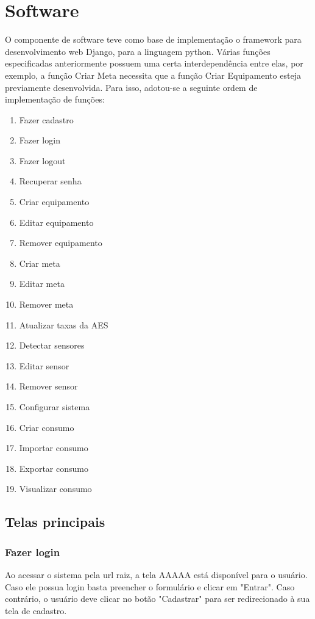\section{Software}
\label{Sec:5-software}

O componente de software teve como base de implementação o framework para desenvolvimento web Django, para a linguagem python. Várias funções especificadas anteriormente possuem uma certa interdependência entre elas, por exemplo, a função Criar Meta necessita que a função Criar Equipamento esteja previamente desenvolvida. Para isso, adotou-se a seguinte ordem de implementação de funções:

\begin{enumerate}
	\item{Fazer cadastro}
	\item{Fazer login}
	\item{Fazer logout}
	\item{Recuperar senha}
	\item{Criar equipamento}
	\item{Editar equipamento}
	\item{Remover equipamento}
	\item{Criar meta}
	\item{Editar meta}
	\item{Remover meta}
	\item{Atualizar taxas da AES}
	\item{Detectar sensores}
	\item{Editar sensor}
	\item{Remover sensor}
	\item{Configurar sistema}
	\item{Criar consumo}
	\item{Importar consumo}
	\item{Exportar consumo}
	\item{Visualizar consumo}
\end{enumerate}

\subsection{Telas principais}
\subsubsection{Fazer login}
Ao acessar o sistema pela url raiz, a tela AAAAA está disponível para o usuário. Caso ele possua login basta preencher o formulário e clicar em "Entrar". Caso contrário, o usuário deve clicar no botão "Cadastrar" para ser redirecionado à sua tela de cadastro.
